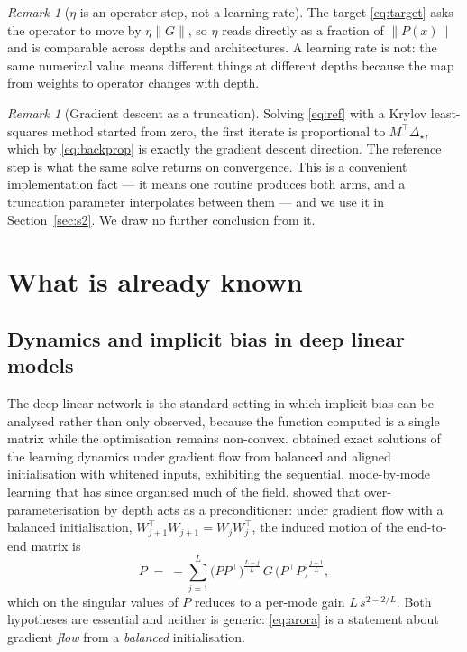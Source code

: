 \documentclass{article} %
\theoremstyle{plain}
\theoremstyle{definition}
\theoremstyle{remark}
\newtheorem{remark}[theorem]{Remark}
\begin{document}
\begin{remark}[$\eta$ is an operator step, not a learning rate]
The target \eqref{eq:target} asks the operator to move by $\eta\|G\|$, so $\eta$ reads directly as
a fraction of $\|P(x)\|$ and is comparable across depths and architectures. A learning rate is not:
the same numerical value means different things at different depths because the map from weights
to operator changes with depth.
\end{remark}

\begin{remark}[Gradient descent as a truncation]
\label{rem:krylov}
Solving \eqref{eq:ref} with a Krylov least-squares method started from zero, the first iterate is
proportional to $M^\top \Delta_\star$, which by \eqref{eq:backprop} is exactly the gradient descent
direction. The reference step is what the same solve returns on convergence. This is a convenient
implementation fact --- it means one routine produces both arms, and a truncation parameter
interpolates between them --- and we use it in Section~\ref{sec:s2}. We draw no further conclusion
from it.
\end{remark}

\section{What is already known}
\label{sec:sota}

\subsection{Dynamics and implicit bias in deep linear models}

The deep linear network is the standard setting in which implicit bias can be analysed rather than
only observed, because the function computed is a single matrix while the optimisation remains
non-convex. \citet{saxe2014exact} obtained exact solutions of the learning dynamics under gradient
flow from balanced and aligned initialisation with whitened inputs, exhibiting the sequential,
mode-by-mode learning that has since organised much of the field.
\citet{arora2018optimization} showed that over-parameterisation by depth acts as a preconditioner:
under gradient flow with a balanced initialisation, $W_{j+1}^\top W_{j+1} = W_j W_j^\top$, the
induced motion of the end-to-end matrix is
\begin{equation}
  \dot P \;=\; -\sum_{j=1}^{L}\big(PP^\top\big)^{\frac{L-j}{L}}\,G\,\big(P^\top P\big)^{\frac{j-1}{L}} ,
  \label{eq:arora}
\end{equation}
which on the singular values of $P$ reduces to a per-mode gain $L\,s^{2-2/L}$. Both hypotheses are
essential and neither is generic: \eqref{eq:arora} is a statement about gradient \emph{flow} from a
\emph{balanced} initialisation.
\end{document}
